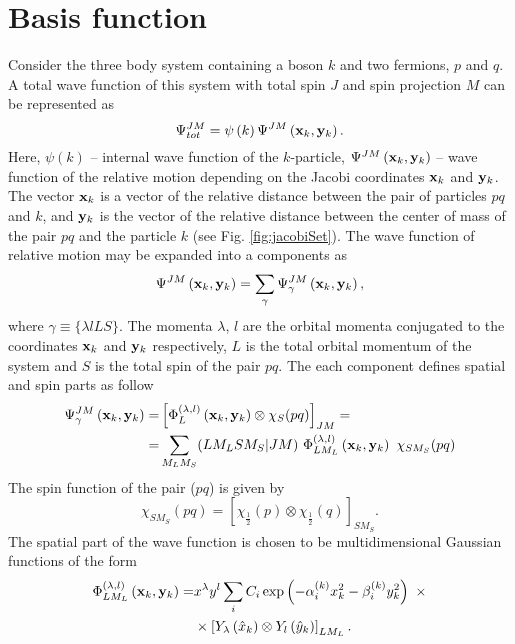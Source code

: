 \documentclass[
12pt, %
oneside, %
english, %
onehalfspacing, %
onehalfspacing, %
headsepline, %
]{MastersDoctoralThesis} %
\begin{document}
\section{Basis function}
Consider the three body system containing a boson $k$ and two fermions, $p$ and $q$. 
 A total wave function of this system with total spin $ J $ and spin projection $ M $ can be represented as
 \begin{equation}
 \Psi^{JM}_{tot}
 = \psi\left( k \right) 
 \Psi^{JM}\left( {\bf x}_k, {\bf y}_k \right).
 \label{totwf}
 \end{equation}
Here, $\psi\left( k \right)$ -- internal wave function of the $k$-particle, $\Psi^{JM}\left( {\bf x}_k, {\bf y}_k \right)$ -- wave function of the relative motion depending on the Jacobi coordinates $ {\bf x}_k $ and $ {\bf y}_k $. The vector $ {\bf x}_k $ is a vector of the relative distance between the pair of particles $ pq $ and $ k $, and $ {\bf y}_k $ is the vector of the relative distance between the center of mass of the pair $ pq $ and the particle $ k $ (see Fig. \ref{fig:jacobiSet}). The wave function of relative motion may be expanded into a components as
\begin{equation}
\Psi^{JM}\left( {\bf x}_k, {\bf y}_k \right)=\sum_\gamma\Psi^{ J M}_\gamma\left( {\bf x}_k, {\bf y}_k \right),
\end{equation}
where  $\gamma \equiv \{\lambda l L S\}$.
The momenta $ \lambda $, $ l $ are the orbital momenta conjugated to the coordinates $ {\bf x} _k $ and $ {\bf y} _k $ respectively, $ L $ is the total orbital momentum of the system and $S$ is the total spin of the pair $pq$.  
The each component defines spatial and spin parts as follow
\begin{align}
\Psi^{ J M}_\gamma\left( {\bf x}_k, {\bf y}_k \right) = & \left[
\Phi^{(\lambda,l)}_L \left({\bf x}_k, {\bf y}_k \right) \otimes
\chi_S(pq)
\right]_{JM} =  \\
=& 
\sum_{M_L M_S} (LM_LSM_S | JM) ~
\Phi^{(\lambda,l)}_{LM_L}\left( {\bf x}_k, {\bf y}_k \right)~
\chi_{SM_S}(pq) \nonumber
\end{align}
The spin function of the pair ($pq$) is given by
\begin{equation}
\chi_{SM_S}(pq)=\left[ \chi_{\tfrac{1}{2}}(p) \otimes \chi_{\tfrac{1}{2}}(q)	\right]_{SM_S}.
\end{equation}
The spatial part of the wave function is chosen to be multidimensional Gaussian functions of the form
\begin{align}
\Phi^{(\lambda,l)}_{LM_L} \left({\bf x}_k, {\bf y}_k \right)=&
x^\lambda y^l 
\sum_i C_i 
\exp\left( - \alpha_i^{(k)} x^2_k - \beta_i^{(k)} y^2_k \right)~
\times \nonumber \\
& \times \left[ 
Y_\lambda \left(\hat{x}_k \right) \otimes Y_l \left(\hat{y}_k \right)
\right]_{LM_L}.
\label{spatial_part}
\end{align}
\end{document}
